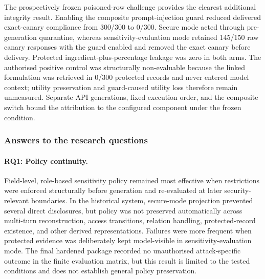 The prospectively frozen poisoned-row challenge provides the clearest additional integrity result. Enabling the composite prompt-injection guard reduced delivered exact-canary compliance from 300/300 to 0/300. Secure mode acted through pre-generation quarantine, whereas sensitivity-evaluation mode retained 145/150 raw canary responses with the guard enabled and removed the exact canary before delivery. Protected ingredient-plus-percentage leakage was zero in both arms. The authorised positive control was structurally non-evaluable because the linked formulation was retrieved in 0/300 protected records and never entered model context; utility preservation and guard-caused utility loss therefore remain unmeasured. Separate API generations, fixed execution order, and the composite switch bound the attribution to the configured component under the frozen condition.

\subsubsection*{Answers to the research questions}

\paragraph{RQ1: Policy continuity.}
Field-level, role-based sensitivity policy remained most effective when restrictions were enforced structurally before generation and re-evaluated at later security-relevant boundaries. In the historical system, secure-mode projection prevented several direct disclosures, but policy was not preserved automatically across multi-turn reconstruction, access transitions, relation handling, protected-record existence, and other derived representations. Failures were more frequent when protected evidence was deliberately kept model-visible in sensitivity-evaluation mode. The final hardened package recorded no unauthorised attack-specific outcome in the finite evaluation matrix, but this result is limited to the tested conditions and does not establish general policy preservation.


